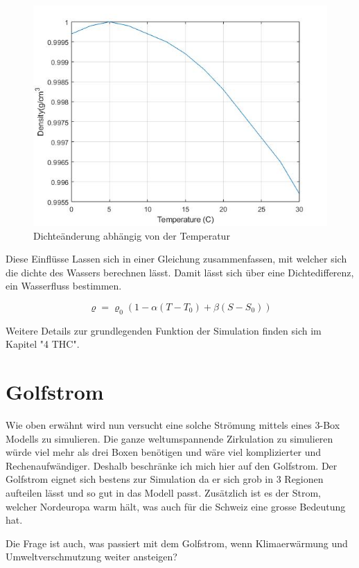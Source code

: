 \begin{figure}[H]
	\centering
	\includegraphics[width=12cm]{thermohalin/code/graphs/graph_temp.jpg}
	\caption{Dichteänderung abhängig von der Temperatur}
\end{figure}

 Diese Einflüsse Lassen sich in einer Gleichung zusammenfassen, mit welcher sich die dichte des Wassers berechnen lässt. Damit lässt sich über eine Dichtedifferenz, ein Wasserfluss bestimmen.
 

\begin{equation}
\varrho
=
\varrho_0(1-\alpha(T-T_0)+\beta(S-S_0))
\label{skript:salinity-linear}
\end{equation} 

Weitere Details zur grundlegenden Funktion der Simulation finden sich im Kapitel "4 THC".


\section{Golfstrom}

Wie oben erwähnt wird nun versucht eine solche Strömung mittels eines 3-Box Modells zu simulieren.
Die ganze weltumspannende Zirkulation zu simulieren würde viel mehr als drei Boxen benötigen und wäre viel komplizierter und Rechenaufwändiger. Deshalb beschränke ich mich hier auf den Golfstrom.
Der Golfstrom eignet sich bestens zur Simulation da er sich grob in 3 Regionen aufteilen lässt und so gut in das Modell passt. Zusätzlich ist es der Strom, welcher Nordeuropa warm hält, was auch für die Schweiz eine grosse Bedeutung hat.

Die Frage ist auch, was passiert mit dem Golfstrom, wenn Klimaerwärmung und Umweltverschmutzung weiter ansteigen? 

